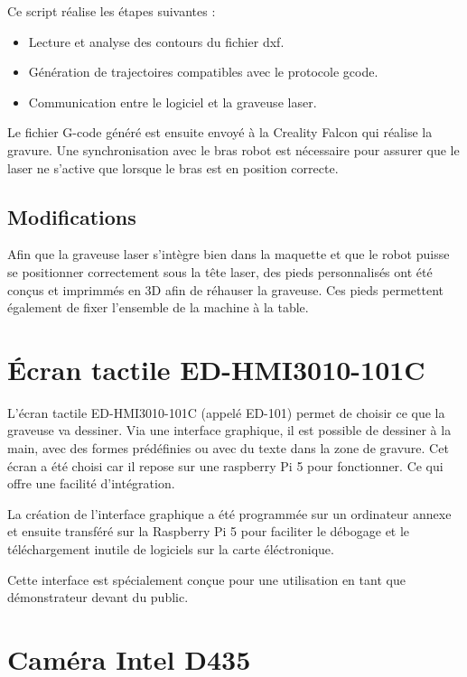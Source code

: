 Ce script réalise les étapes suivantes :
\begin{itemize}
    \item Lecture et analyse des contours du fichier \gls{dxf}.
    \item Génération de trajectoires compatibles avec le protocole \gls{gcode}.
    \item Communication entre le logiciel et la graveuse laser.
\end{itemize}

Le fichier G-code généré est ensuite envoyé à la Creality Falcon qui réalise la gravure. Une synchronisation avec le bras robot est nécessaire pour assurer que le laser ne s'active que lorsque le bras est en position correcte.

\subsection{Modifications}

Afin que la graveuse laser s'intègre bien dans la maquette et que le robot puisse se positionner correctement sous la tête laser, des pieds personnalisés ont été conçus et imprimmés en 3D afin de réhauser la graveuse. Ces pieds permettent également de fixer l'ensemble de la machine à la table.

\section{Écran tactile ED-HMI3010-101C}

L’écran tactile ED-HMI3010-101C \cite{ED-101} (appelé ED-101) permet de choisir ce que la graveuse va dessiner. Via une interface graphique, il est possible de dessiner à la main, avec des formes prédéfinies ou avec du texte dans la zone de gravure.
Cet écran a été choisi car il repose sur une raspberry Pi 5 pour fonctionner. Ce qui offre une facilité d'intégration.

La création de l'interface graphique a été programmée sur un ordinateur annexe et ensuite transféré sur la Raspberry Pi 5 pour faciliter le débogage et le téléchargement inutile de logiciels sur la carte éléctronique.

Cette interface est spécialement conçue pour une utilisation en tant que démonstrateur devant du public.

\section{Caméra Intel D435}

